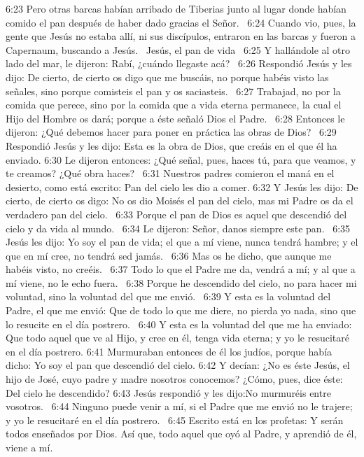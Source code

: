6:23 Pero otras barcas habían arribado de Tiberias junto al lugar donde habían comido el pan después de haber dado gracias el Señor.  
6:24 Cuando vio, pues, la gente que Jesús no estaba allí, ni sus discípulos, entraron en las barcas y fueron a Capernaum, buscando a Jesús.  
Jesús, el pan de vida  
6:25 Y hallándole al otro lado del mar, le dijeron: Rabí, ¿cuándo llegaste acá?  
6:26 Respondió Jesús y les dijo: De cierto, de cierto os digo que me buscáis, no porque habéis visto las señales, sino porque comisteis el pan y os saciasteis.  
6:27 Trabajad, no por la comida que perece, sino por la comida que a vida eterna permanece, la cual el Hijo del Hombre os dará; porque a éste señaló Dios el Padre.  
6:28 Entonces le dijeron: ¿Qué debemos hacer para poner en práctica las obras de Dios?  
6:29 Respondió Jesús y les dijo: Esta es la obra de Dios, que creáis en el que él ha enviado. 
6:30 Le dijeron entonces: ¿Qué señal, pues, haces tú, para que veamos, y te creamos? ¿Qué obra haces?  
6:31 Nuestros padres comieron el maná en el desierto, como está escrito: Pan del cielo les dio a comer. 
6:32 Y Jesús les dijo: De cierto, de cierto os digo: No os dio Moisés el pan del cielo, mas mi Padre os da el verdadero pan del cielo.  
6:33 Porque el pan de Dios es aquel que descendió del cielo y da vida al mundo.  
6:34 Le dijeron: Señor, danos siempre este pan.  
6:35 Jesús les dijo: Yo soy el pan de vida; el que a mí viene, nunca tendrá hambre; y el que en mí cree, no tendrá sed jamás.  
6:36 Mas os he dicho, que aunque me habéis visto, no creéis.  
6:37 Todo lo que el Padre me da, vendrá a mí; y al que a mí viene, no le echo fuera.  
6:38 Porque he descendido del cielo, no para hacer mi voluntad, sino la voluntad del que me envió.  
6:39 Y esta es la voluntad del Padre, el que me envió: Que de todo lo que me diere, no pierda yo nada, sino que lo resucite en el día postrero.  
6:40 Y esta es la voluntad del que me ha enviado: Que todo aquel que ve al Hijo, y cree en él, tenga vida eterna; y yo le resucitaré en el día postrero. 
6:41 Murmuraban entonces de él los judíos, porque había dicho: Yo soy el pan que descendió del cielo. 
6:42 Y decían: ¿No es éste Jesús, el hijo de José, cuyo padre y madre nosotros conocemos? ¿Cómo, pues, dice éste: Del cielo he descendido? 
6:43 Jesús respondió y les dijo:No murmuréis entre vosotros.  
6:44 Ninguno puede venir a mí, si el Padre que me envió no le trajere; y yo le resucitaré en el día postrero.  
6:45 Escrito está en los profetas: Y serán todos enseñados por Dios. Así que, todo aquel que oyó al Padre, y aprendió de él, viene a mí.  
